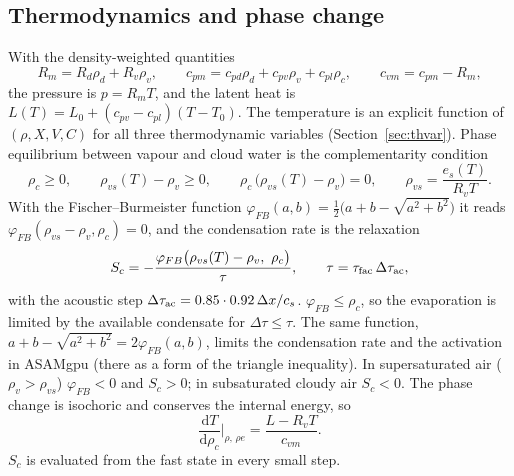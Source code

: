 \documentclass[11pt,a4paper]{article}
\newcommand{\dtau}{\Delta\tau}
\begin{document}
\subsection{Thermodynamics and phase change}
With the density-weighted quantities
\[
R_m=R_d\rho_d+R_v\rho_v,\qquad c_{pm}=c_{pd}\rho_d+c_{pv}\rho_v+c_{pl}\rho_c,\qquad c_{vm}=c_{pm}-R_m,
\]
the pressure is $p=R_mT$, and the latent heat is $L(T)=L_0+(c_{pv}-c_{pl})(T-T_0)$. The temperature is an
explicit function of $(\rho,X,V,C)$ for all three thermodynamic variables (Section~\ref{sec:thvar}). Phase
equilibrium between vapour and cloud water is the complementarity condition
\[
\rho_c\ge0,\qquad\rho_{vs}(T)-\rho_v\ge0,\qquad\rho_c\,\big(\rho_{vs}(T)-\rho_v\big)=0,\qquad\rho_{vs}=\frac{e_s(T)}{R_vT}.
\]
With the Fischer--Burmeister function \cite{fischer} $\varphi_{FB}(a,b)=\tfrac12\big(a+b-\sqrt{a^2+b^2}\big)$ it
reads $\varphi_{FB}(\rho_{vs}-\rho_v,\rho_c)=0$, and the condensation rate is the relaxation
\begin{equation}
S_c=-\frac{\varphi_{FB}\big(\rho_{vs}(T)-\rho_v,\ \rho_c\big)}{\tau},\qquad\tau=\tau_{\rm fac}\,\dtau_{\rm ac},\label{eq:Sc}
\end{equation}
with the acoustic step $\dtau_{\rm ac}=0.85\cdot0.92\,\Delta x/c_s$. $\varphi_{FB}\le\rho_c$, so the
evaporation is limited by the available condensate for $\dtau\le\tau$. The same function, $a+b-\sqrt{a^2+b^2}=2\varphi_{FB}(a,b)$, limits the
condensation rate and the activation in ASAMgpu \cite{horn} (there as a form of the triangle inequality). In supersaturated air
($\rho_v>\rho_{vs}$) $\varphi_{FB}<0$ and $S_c>0$; in subsaturated cloudy air $S_c<0$. The phase change is
isochoric and conserves the internal energy, so
\[
\frac{\mathrm dT}{\mathrm d\rho_c}\Big|_{\rho,\,\rho e}=\frac{L-R_vT}{c_{vm}} .
\]
$S_c$ is evaluated from the fast state in every small step.

\end{document}
